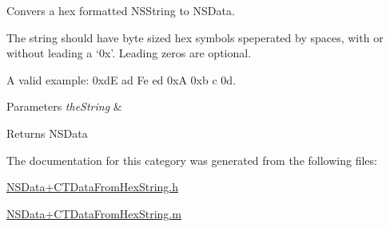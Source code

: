 Convers a hex formatted N\-S\-String to N\-S\-Data. 

The string should have byte sized hex symbols speperated by spaces, with or without leading a `0x'. Leading zeros are optional.

A valid example\-: {\ttfamily 0xd\-E ad Fe ed 0x\-A 0xb c 0d}.


\begin{DoxyParams}{Parameters}
{\em the\-String} & \\
\hline
\end{DoxyParams}
\begin{DoxyReturn}{Returns}
N\-S\-Data 
\end{DoxyReturn}


The documentation for this category was generated from the following files\-:\begin{DoxyCompactItemize}
\item 
\hyperlink{_n_s_data_09_c_t_data_from_hex_string_8h}{N\-S\-Data+\-C\-T\-Data\-From\-Hex\-String.\-h}\item 
\hyperlink{_n_s_data_09_c_t_data_from_hex_string_8m}{N\-S\-Data+\-C\-T\-Data\-From\-Hex\-String.\-m}\end{DoxyCompactItemize}
